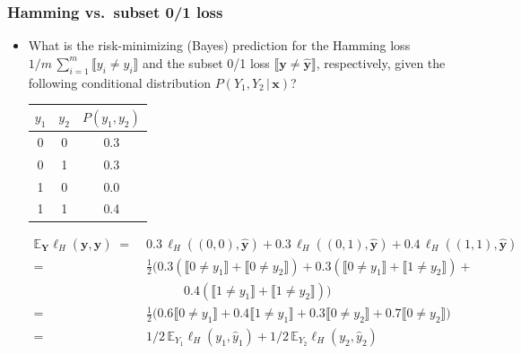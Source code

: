 \documentclass[]{beamer}
\renewcommand{\Pr}{P}
\renewcommand{\vec}[1]{\boldsymbol{#1}}
\newcommand{\by}{\boldsymbol{y}}
\newcommand{\assert}[1]{\llbracket #1 \rrbracket}
\renewcommand{\emph}[1]{\textbf{\color{putblue}#1}}
\begin{document}
\begin{frame}
\frametitle{Hamming vs.\ subset 0/1 loss}
\begin{itemize}
\item What is the risk-minimizing (Bayes) prediction for the Hamming loss $1/m  \, \sum_{i=1}^m \assert{y_i \neq  y_i}$ and the subset 0/1 loss $\assert{\by \ne \hat{\by}}$, respectively, given the following conditional distribution $\Pr(Y_1,Y_2 \, \vert \, \vec{x})$?

\medskip

\begin{center}
\begin{tabular}{ccc}
\toprule
$y_1$ & $y_2$ & $\Pr(y_1,y_2)$  \\
\midrule
0   & 0   & 0.3    \\
0   & 1   & 0.3        \\
1   & 0   & 0.0       \\
1   & 1   & 0.4     \\
\bottomrule
\end{tabular}
\end{center}

\small
\begin{align*}
\mathbb{E}_{\mathbf{Y}} \ell_H(\by, \hat{\by}) \; = \; & 0.3 \, \ell_H((0,0),\hat{\by}) +  0.3 \, \ell_H((0,1),\hat{\by}) +  0.4 \, \ell_H((1,1),\hat{\by}) \\  
= \; & \frac{1}{2} \big( 0.3( \assert{0 \neq y_1} + \assert{0 \neq y_2}) + 
0.3( \assert{0 \neq y_1} + \assert{1 \neq y_2}) + \\
& \quad\quad\quad
0.4( \assert{1 \neq y_1} + \assert{1 \neq y_2}) \big) \\
= \; & \frac{1}{2} \big( 0.6 \assert{0 \neq y_1} + 0.4 \assert{1 \neq y_1} + 0.3 \assert{0 \neq y_2} + 0.7 \assert{0 \neq y_2} \big) \\
= \; & 1/2 \, \mathbb{E}_{Y_1} \ell_H(y_1, \hat{y}_1) + 1/2 \, \mathbb{E}_{Y_2} \ell_H(y_2, \hat{y}_2)
\end{align*}



\end{itemize}
\end{frame}
\end{document}

